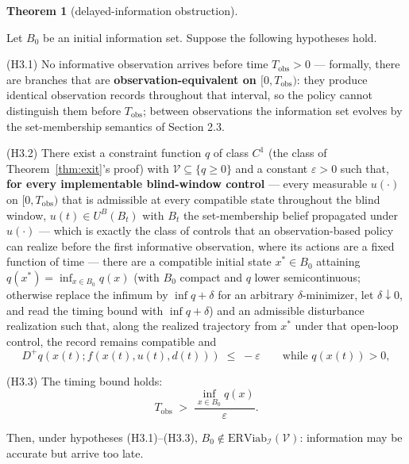 \documentclass[11pt]{article}
\theoremstyle{definition}
\newtheorem{theorem}{Theorem}
\begin{document}
\begin{theorem}[delayed-information obstruction]\label{thm:delayed}

Let \(B_0\) be an initial information set. Suppose the following
hypotheses hold.

(H3.1) No informative observation arrives before time
\(T_{\mathrm{obs}} > 0\) --- formally, there are branches that are
\textbf{observation-equivalent on \([0, T_{\mathrm{obs}})\)}: they
produce identical observation records throughout that interval, so the
policy cannot distinguish them before \(T_{\mathrm{obs}}\); between
observations the information set evolves by the set-membership semantics
of Section 2.3.

(H3.2) There exist a constraint function \(q\) of class \(C^1\) (the
class of Theorem~\ref{thm:exit}'s proof) with \(\mathcal{V} \subseteq \{ q \ge 0 \}\)
and a constant \(\varepsilon > 0\) such that, \textbf{for every implementable blind-window control} --- every
measurable \(u(\cdot)\) on \([0, T_{\mathrm{obs}})\) that is admissible at
every compatible state throughout the blind window, \(u(t) \in U^B(B_t)\)
with \(B_t\) the set-membership belief propagated under \(u(\cdot)\) ---
which is exactly the class of controls that an observation-based policy
can realize before the first informative observation, where its actions
are a fixed function of time --- there are a compatible initial state \(x^* \in B_0\) attaining
\(q(x^*) = \inf_{x \in B_0} q(x)\) (with \(B_0\) compact and \(q\) lower
semicontinuous; otherwise replace the infimum by \(\inf q + \delta\) for
an arbitrary \(\delta\)-minimizer, let \(\delta \downarrow 0\), and read
the timing bound with \(\inf q + \delta\)) and an admissible disturbance
realization such that, along the realized trajectory from \(x^*\) under
that open-loop control, the record remains compatible and
\[D^+ q(x(t); f(x(t), u(t), d(t))) \;\le\; -\varepsilon \qquad \text{while } q(x(t)) > 0, \tag{2}\]

(H3.3) The timing bound holds:
\[T_{\mathrm{obs}} \;>\; \frac{\inf_{x \in B_0} q(x)}{\varepsilon}. \tag{3}\]

Then, under hypotheses (H3.1)--(H3.3),
\(B_0 \notin \mathrm{ERViab}_{\mathcal{I}}(\mathcal{V})\): information
may be accurate but arrive too late.

\end{theorem}
\end{document}
